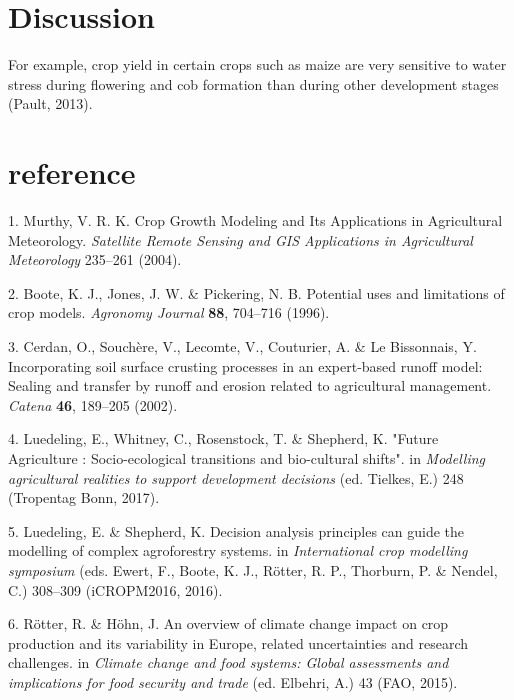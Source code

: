 \documentclass[11pt,preprint]{article}
\begin{document}
\hypertarget{discussion}{%
\section{Discussion}\label{discussion}}

For example, crop yield in certain crops such as maize are very
sensitive to water stress during flowering and cob formation than during
other development stages (Pault, 2013).

\hypertarget{reference}{%
\section*{reference}\label{reference}}

\hypertarget{refs}{}
\leavevmode\hypertarget{ref-Murthy_2004}{}%
1. Murthy, V. R. K. Crop Growth Modeling and Its Applications in
Agricultural Meteorology. \emph{Satellite Remote Sensing and GIS
Applications in Agricultural Meteorology} 235--261 (2004).

\leavevmode\hypertarget{ref-Boote_et_al_1996}{}%
2. Boote, K. J., Jones, J. W. \& Pickering, N. B. Potential uses and
limitations of crop models. \emph{Agronomy Journal} \textbf{88},
704--716 (1996).

\leavevmode\hypertarget{ref-Cerdan_et_al_2002}{}%
3. Cerdan, O., Souchère, V., Lecomte, V., Couturier, A. \& Le
Bissonnais, Y. Incorporating soil surface crusting processes in an
expert-based runoff model: Sealing and transfer by runoff and erosion
related to agricultural management. \emph{Catena} \textbf{46}, 189--205
(2002).

\leavevmode\hypertarget{ref-Luedeling_et_al_2017}{}%
4. Luedeling, E., Whitney, C., Rosenstock, T. \& Shepherd, K. "Future
Agriculture : Socio-ecological transitions and bio-cultural shifts". in
\emph{Modelling agricultural realities to support development decisions}
(ed. Tielkes, E.) 248 (Tropentag Bonn, 2017).

\leavevmode\hypertarget{ref-Luedeling_and_Shepherd_2016}{}%
5. Luedeling, E. \& Shepherd, K. Decision analysis principles can guide
the modelling of complex agroforestry systems. in \emph{International
crop modelling symposium} (eds. Ewert, F., Boote, K. J., Rötter, R. P.,
Thorburn, P. \& Nendel, C.) 308--309 (iCROPM2016, 2016).

\leavevmode\hypertarget{ref-Rotter_and_Hohn_2015}{}%
6. Rötter, R. \& Höhn, J. An overview of climate change impact on crop
production and its variability in Europe, related uncertainties and
research challenges. in \emph{Climate change and food systems: Global
assessments and implications for food security and trade} (ed. Elbehri,
A.) 43 (FAO, 2015).
\end{document}
